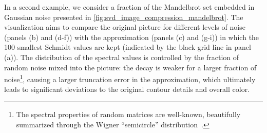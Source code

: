 \documentclass{svmono}
\begin{document}
In a second example, we consider a fraction of the Mandelbrot set embedded in Gaussian noise presented in \cref{fig:svd_image_compression_mandelbrot}.
The visualization aims to compare the original picture for different levels of noise (panels (b) and (d-f)) with the approximation (panels (c) and (g-i)) in which the 100 smallest Schmidt values are kept (indicated by the black grid line in panel (a)).
The distribution of the spectral values is controlled by the fraction of random noise mixed into the picture: the decay is weaker for a larger fraction of noise\footnote{The spectral properties of random matrices are well-known, beautifully summarized through the Wigner ``semicircle'' distribution~\cite{Wigner1958OnTD}.}, causing a larger truncation error in the approximation, which ultimately leads to significant deviations to the original contour details and overall color.
\end{document}
